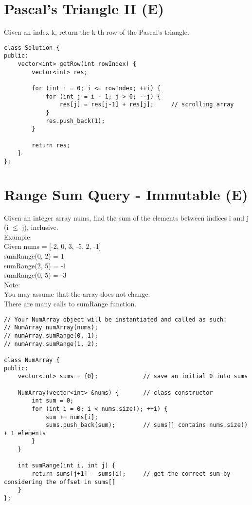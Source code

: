 \section{Pascal's Triangle II (E)}
Given an index k, return the k-th row of the Pascal's triangle. \\

\begin{lstlisting}
class Solution {
public:
    vector<int> getRow(int rowIndex) {
        vector<int> res;
        
        for (int i = 0; i <= rowIndex; ++i) {
            for (int j = i - 1; j > 0; --j) {
                res[j] = res[j-1] + res[j];     // scrolling array
            }
            res.push_back(1);
        }
        
        return res;
    }
};
\end{lstlisting}


\section{Range Sum Query - Immutable (E)}
Given an integer array nums, find the sum of the elements between indices i and j (i $\leq$ j), inclusive.\\

Example: \\
Given nums = [-2, 0, 3, -5, 2, -1]\\
sumRange(0, 2) = 1\\
sumRange(2, 5) = -1\\
sumRange(0, 5) = -3\\

Note:\\
    You may assume that the array does not change.\\
    There are many calls to sumRange function.\\

\begin{lstlisting}
// Your NumArray object will be instantiated and called as such:
// NumArray numArray(nums);
// numArray.sumRange(0, 1);
// numArray.sumRange(1, 2);

class NumArray {
public:
    vector<int> sums = {0};             // save an initial 0 into sums
    
    NumArray(vector<int> &nums) {       // class constructor
        int sum = 0;
        for (int i = 0; i < nums.size(); ++i) {
            sum += nums[i];
            sums.push_back(sum);        // sums[] contains nums.size() + 1 elements
        }
    }
    
    int sumRange(int i, int j) {
        return sums[j+1] - sums[i];     // get the correct sum by considering the offset in sums[]
    }
};
\end{lstlisting}


